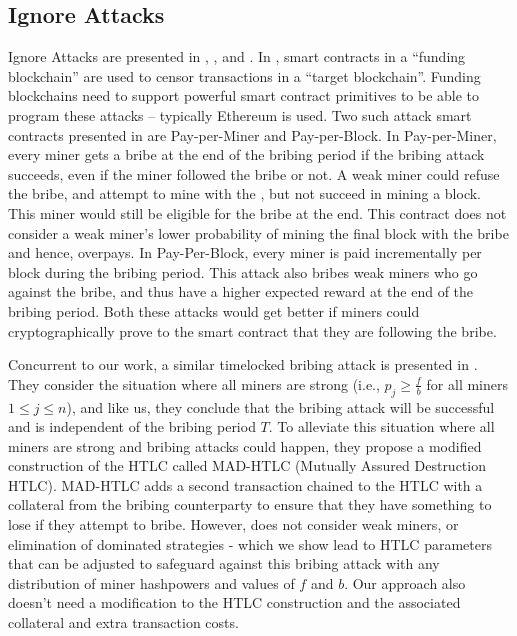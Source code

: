 \subsection{Ignore Attacks}
Ignore Attacks are presented in \cite{temporary_censorship_attack_ethereum}, \cite{pay_to_win}, and \cite{mad_htlc}. In \cite{temporary_censorship_attack_ethereum}, smart contracts in a ``funding blockchain'' are used to censor transactions in a ``target blockchain''. Funding blockchains need to support powerful smart contract primitives to be able to program these attacks -- typically Ethereum is used. Two such attack smart contracts presented in \cite{temporary_censorship_attack_ethereum} are Pay-per-Miner and Pay-per-Block. In Pay-per-Miner, every miner gets a bribe at the end of the bribing period if the bribing attack succeeds, even if the miner followed the bribe or not. A weak miner could refuse the bribe, and attempt to mine with the \sellertxn{}, but not succeed in mining a block. This miner would still be eligible for the bribe at the end. This contract does not consider a weak miner's lower probability of mining the final block with the bribe and hence, overpays. In Pay-Per-Block, every miner is paid incrementally per block during the bribing period. This attack also bribes weak miners who go against the bribe, and thus have a higher expected reward at the end of the bribing period. Both these attacks would get better if miners could cryptographically prove to the smart contract that they are following the bribe.

Concurrent to our work, a similar timelocked bribing attack is presented in \cite{mad_htlc}. They consider the situation where all miners are strong (i.e., $p_j\geq \frac{f}{b}$ for all miners $1\leq j\leq n$), and like us, they conclude that the bribing attack will be successful and is independent of the bribing period $T$. To alleviate this situation where all miners are strong and bribing attacks could happen, they propose a modified construction of the HTLC called MAD-HTLC (Mutually Assured Destruction HTLC). MAD-HTLC adds a second transaction chained to the HTLC with a collateral from the bribing counterparty to ensure that they have something to lose if they attempt to bribe. However, \cite{mad_htlc} does not consider weak miners, or elimination of dominated strategies - which we show lead to HTLC parameters that can be adjusted to safeguard against this bribing attack with any distribution of miner hashpowers and values of $f$ and $b$. Our approach also doesn't need a modification to the HTLC construction and the associated collateral and extra transaction costs.

